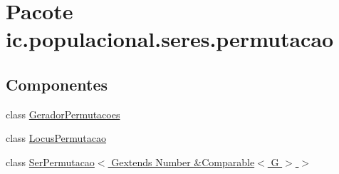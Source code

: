 \hypertarget{namespaceic_1_1populacional_1_1seres_1_1permutacao}{\section{Pacote ic.\-populacional.\-seres.\-permutacao}
\label{namespaceic_1_1populacional_1_1seres_1_1permutacao}
}
\subsection*{Componentes}
\begin{DoxyCompactItemize}
\item 
class \hyperlink{classic_1_1populacional_1_1seres_1_1permutacao_1_1_gerador_permutacoes}{Gerador\-Permutacoes}
\item 
class \hyperlink{classic_1_1populacional_1_1seres_1_1permutacao_1_1_locus_permutacao}{Locus\-Permutacao}
\item 
class \hyperlink{classic_1_1populacional_1_1seres_1_1permutacao_1_1_ser_permutacao_3_01_gextends_01_number_01_6_comparable_3_01_g_01_4_01_4}{Ser\-Permutacao$<$ Gextends Number \&\-Comparable$<$ G $>$ $>$}
\end{DoxyCompactItemize}
